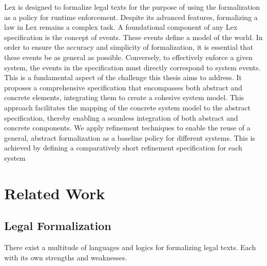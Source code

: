 Lex is designed to formalize legal texts for the purpose of using the formalization as a policy for runtime enforcement.
Despite its advanced features, formalizing a law in Lex remains a complex task.
A foundational component of any Lex specification is the concept of events.
These events define a model of the world.
In order to ensure the accuracy and simplicity of formalization, it is essential that these events be as general as possible.
Conversely, to effectively enforce a given system, the events in the specification must directly correspond to system events.
This is a fundamental aspect of the challenge this thesis aims to address.
It proposes a comprehensive specification that encompasses both abstract and concrete elements, integrating them to create a cohesive system model.
This approach facilitates the mapping of the concrete system model to the abstract specification, thereby enabling a seamless integration of both abstract and concrete components.
We apply refinement techniques to enable the reuse of a general, abstract formalization as a baseline policy for different systems. This is achieved by defining a comparatively short refinement specification for each system

\section{Related Work}
\label{section:related-work}

\subsection{Legal Formalization}
There exist a multitude of languages and logics
for formalizing legal texts.
Each with its own strengths and weaknesses.

